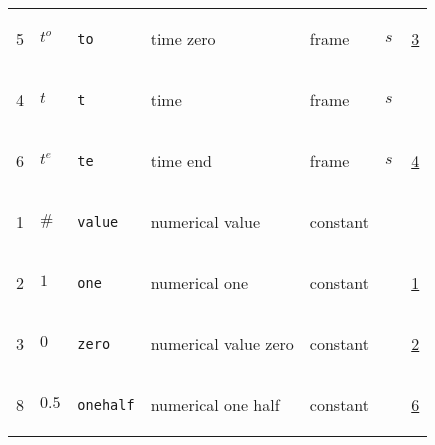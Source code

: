 \begin{longtable}{|p{1cm}|p{2.5cm}|p{4.5cm}|p{8cm}|p{3.0cm}|p{3cm}|p{1cm}|}
                 \\
            5
             & \hypertarget{"v:5"}{ $ {{t^o}}{_{}} $}
             & \verb|to|
             & time zero
             & \begin{lay}frame \end{lay}
             & $ s \, $
             &                 \hyperlink{"e:3"}{ 3 }
                 \\
            4
             & \hypertarget{"v:4"}{ $ {t}{_{}} $}
             & \verb|t|
             & time
             & \begin{lay}frame \end{lay}
             & $ s \, $
             & \\
            6
             & \hypertarget{"v:6"}{ $ {{t^e}}{_{}} $}
             & \verb|te|
             & time end
             & \begin{lay}frame \end{lay}
             & $ s \, $
             &                 \hyperlink{"e:4"}{ 4 }
                 \\
            1
             & \hypertarget{"v:1"}{ $ {{\#}}{_{}} $}
             & \verb|value|
             & numerical value
             & \begin{lay}constant \end{lay}
             & $  $
             & \\
            2
             & \hypertarget{"v:2"}{ $ {1}{_{}} $}
             & \verb|one|
             & numerical one
             & \begin{lay}constant \end{lay}
             & $  $
             &                 \hyperlink{"e:1"}{ 1 }
                 \\
            3
             & \hypertarget{"v:3"}{ $ {0}{_{}} $}
             & \verb|zero|
             & numerical value zero
             & \begin{lay}constant \end{lay}
             & $  $
             &                 \hyperlink{"e:2"}{ 2 }
                 \\
            8
             & \hypertarget{"v:8"}{ $ {0.5}{_{}} $}
             & \verb|onehalf|
             & numerical one half
             & \begin{lay}constant \end{lay}
             & $  $
             &                 \hyperlink{"e:6"}{ 6 }
                 \\
    \end{longtable}